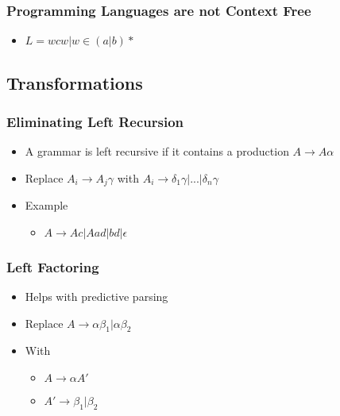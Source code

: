 \documentclass[usepdftitle=false,professionalfonts,compress ]{beamer}
\begin{document}
{
\begin{frame}\frametitle{Programming Languages are not Context Free}

	\begin{itemize}
	\item $ L = {wcw | w \in (a|b)*}$
				\end{itemize}

\end{frame}}



\subsection{Transformations}

{
\begin{frame}\frametitle{Eliminating Left Recursion}

	\begin{itemize}
	\item A grammar is left recursive if it contains a production $A \rightarrow A\alpha$
			\item Replace $A_i \rightarrow A_j \gamma$ with $A_i \rightarrow \delta_1 \gamma | ... | \delta_n \gamma$
			\item Example

	\begin{itemize}
	\item $A\rightarrow Ac|Aad|bd|\epsilon$
				\end{itemize}

				\end{itemize}

\end{frame}}





{
\begin{frame}\frametitle{Left Factoring}

	\begin{itemize}
	\item Helps with predictive parsing
			\item Replace $A \rightarrow \alpha \beta_1 | \alpha \beta_2$
			\item With

	\begin{itemize}
	\item $A \rightarrow \alpha A'$
			\item $A' \rightarrow \beta_1 | \beta_2$
				\end{itemize}

				\end{itemize}

\end{frame}}
\end{document}
